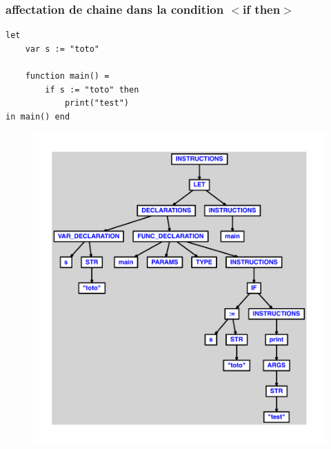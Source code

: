 \documentclass{article}
\begin{document}
\subsubsection{affectation de chaine dans la condition $ < $if then$ > $}
\begin{lstlisting}
let
	var s := "toto"

	function main() =
		if s := "toto" then
			print("test")
in main() end
\end{lstlisting}
\newpage
\begin{figure}[H]
\centering
\includegraphics[max width=\textwidth]{ast/ast_250.pdf}
\end{figure}
\newpage
\end{document}
